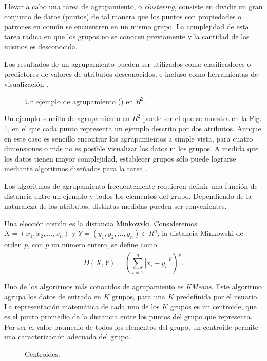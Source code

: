 Llevar a cabo una tarea de agrupamiento, o \textit{clustering}, consiste en dividir un gran conjunto de datos (puntos) de tal manera que los puntos con propiedades o patrones en común se encuentren en un mismo grupo. La complejidad de esta tarea radica en que los grupos no se conocen previamente y la cantidad de los mismos es desconocida. 

Los resultados de un agrupamiento pueden ser utilizados como clasificadores o predictores de valores de atributos desconocidos, e incluso como herramientas de visualización \cite{kubat_introduction_2017}.

 \begin{figure}[htbp]
   \centering
   
    \caption{Un ejemplo de agrupamiento () en $R^2$.}
    \label{fig:clustering-example}
\end{figure}

Un ejemplo sencillo de agrupamiento en $R^2$ puede ser el que se muestra en la Fig. \ref{fig:clustering-example}, en el que cada punto representa un ejemplo descrito por dos atributos. Aunque en este caso es sencillo encontrar los agrupamientos a simple vista, para cuatro dimensiones o más no es posible visualizar los datos ni los grupos. A medida que los datos tienen mayor complejidad, establecer grupos sólo puede lograrse mediante algoritmos diseñados para la tarea \cite{kubat_introduction_2017}.

Los algoritmos de agrupamiento frecuentemente requieren definir una función de distancia entre un ejemplo y todos los elementos del grupo. Dependiendo de la naturaleza de los atributos, distintas medidas pueden ser convenientes. 

Una elección común es la distancia Minkowski. Consideremos $X = (x_1,x_2,\ldots,x_n)$ y $Y=(y_1,y_2,\ldots ,y_n) \in R^n$, la distancia Minkowski de orden $p$, con $p$ un número entero, se define como 
$$D(X,Y) = (\sum_{i=1}^{n}|x_{i}-y_{i}|^{p})^{\frac{1}{p}}.$$

Uno de los algoritmos más conocidos de agrupamiento es \textit{KMeans}. Este algoritmo agrupa los datos de entrada en $K$ grupos, para una $K$ predefinida por el usuario. La representación matemática de cada uno de los $K$ grupos es un centroide, que es el punto promedio de la distancia entre los puntos del grupo que representa. Por ser el valor promedio de todos los elementos del grupo, un centroide permite una caracterización adecuada del grupo. 

 \begin{figure}[htbp]
   \centering
   
    \caption{Centroides.}
    \label{fig:centroides}
\end{figure}

